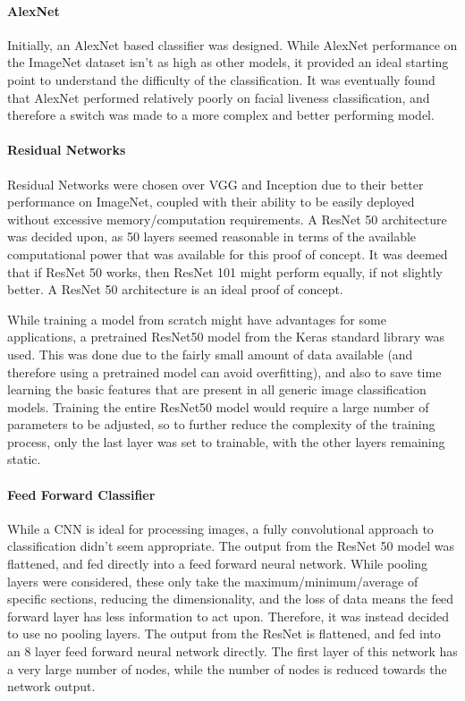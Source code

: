 \documentclass[11pt,a4paper]{article}
\begin{document}
                \paragraph{AlexNet}
                Initially, an AlexNet based classifier was designed. While AlexNet performance on the ImageNet dataset isn't as high as other models, it provided an ideal starting point to understand the difficulty
                of the classification. It was eventually found that AlexNet performed relatively poorly on facial liveness classification, and therefore a switch was made to a more complex and better performing model.

                \paragraph{Residual Networks}
                Residual Networks were chosen over VGG and Inception due to their better performance on ImageNet, coupled with their ability to be easily deployed without excessive memory/computation requirements.
                A ResNet 50 architecture was decided upon, as 50 layers seemed reasonable in terms of the available computational power that was available for this proof of concept. It was deemed that if ResNet 50 works, then ResNet 101 might perform equally, if not
                slightly better. A ResNet 50 architecture is an ideal proof of concept.

                While training a model from scratch might have advantages for some applications, a pretrained ResNet50 model from the Keras standard library was used. This was done due to the fairly small amount of data
                available (and therefore using a pretrained model can avoid overfitting), and also to save time learning the basic features that are present in all generic image classification models. Training the entire
                ResNet50 model would require a large number of parameters to be adjusted, so to further reduce the complexity of the training process, only the last layer was set to trainable, with the other layers remaining static.


                \paragraph{Feed Forward Classifier}
                While a CNN is ideal for processing images, a fully convolutional approach to classification didn't seem appropriate. The output from the ResNet 50 model was flattened, and fed directly into a feed forward neural network.
                While pooling layers were considered, these only take the maximum/minimum/average of specific sections, reducing the dimensionality, and the loss of data means the feed forward layer has less information to act upon. Therefore,
                it was instead decided to use no pooling layers. The output from the ResNet is flattened, and fed into an 8 layer feed forward neural network directly. The first layer of this network has a very large number of nodes,
                while the number of nodes is reduced towards the network output.
                
\end{document}
